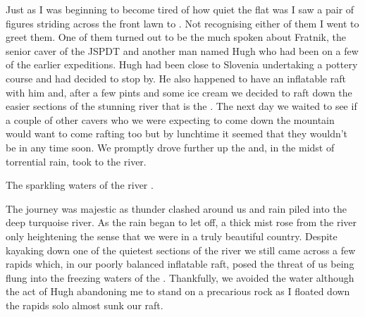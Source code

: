 Just as I was beginning to become tired of how quiet the flat was I saw
a pair of figures striding across the front lawn to . Not
recognising either of them I went to greet them. One of them turned out
to be the much spoken about Fratnik, the senior caver of the JSPDT and
another man named Hugh who had been on a few of the earlier expeditions.
Hugh had been close to Slovenia undertaking a pottery course and had
decided to stop by. He also happened to have an inflatable raft with him
and, after a few pints and some ice cream we decided to raft down the
easier sections of the stunning river that is the . The next day we
waited to see if a couple of other cavers who we were expecting to come
down the mountain would want to come rafting too but by lunchtime it
seemed that they wouldn't be in  any time soon. We promptly drove
further up the  and, in the midst of torrential rain, took to the
river.

\begin{marginfigure}
\checkoddpage \ifoddpage \forcerectofloat \else \forceversofloat \fi
\centering
 \caption{The sparkling waters of the river . }
 \label{kate soca}
\end{marginfigure}

The journey was majestic as thunder clashed around us and rain piled
into the deep turquoise river. As the rain began to let off, a thick
mist rose from the river only heightening the sense that we were in a
truly beautiful country. Despite kayaking down one of the quietest
sections of the river we still came across a few rapids which, in our
poorly balanced inflatable raft, posed the threat of us being flung into
the freezing waters of the . Thankfully, we avoided the water
although the act of Hugh abandoning me to stand on a precarious rock as
I floated down the rapids solo almost sunk our raft.

